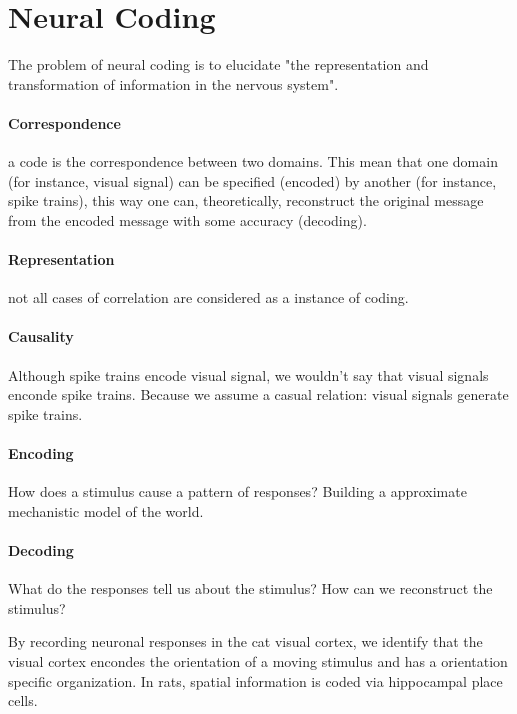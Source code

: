 \documentclass[main]{subfiles}
\begin{document}

\section{Neural Coding}

The problem of neural coding is to elucidate "the representation and transformation of information in the nervous system".

\paragraph{Correspondence} a code is the correspondence between two domains. This mean that one domain (for instance, visual signal) can be specified (encoded) by another (for instance, spike trains), this way one can, theoretically, reconstruct  the original message from the encoded message with some accuracy (decoding).

\paragraph{Representation} not all cases of correlation are considered as a instance of coding.

\paragraph{Causality} Although spike trains encode visual signal, we wouldn't say that visual signals enconde spike trains. Because we assume a casual relation: visual signals generate spike trains.

\paragraph{Encoding} How does a stimulus cause a pattern of responses? Building a approximate mechanistic model of the world.

\paragraph{Decoding} What do the responses tell us about the stimulus? How can we reconstruct the stimulus?

By recording neuronal responses in the cat visual cortex, we identify that the visual cortex encondes the orientation of a moving stimulus and has a orientation specific organization.
In rats, spatial information is coded via hippocampal place cells.
\end{document}
